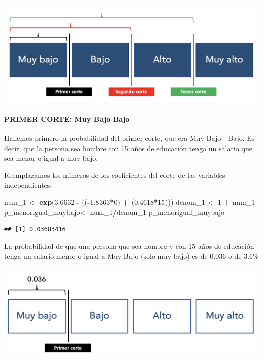 \documentclass[
]{article}
\newenvironment{Shaded}{\begin{snugshade}}{\end{snugshade}}
\newcommand{\DecValTok}[1]{\textcolor[rgb]{0.00,0.00,0.81}{#1}}
\newcommand{\FloatTok}[1]{\textcolor[rgb]{0.00,0.00,0.81}{#1}}
\newcommand{\FunctionTok}[1]{\textcolor[rgb]{0.13,0.29,0.53}{\textbf{#1}}}
\newcommand{\NormalTok}[1]{#1}
\newcommand{\OtherTok}[1]{\textcolor[rgb]{0.56,0.35,0.01}{#1}}
\newcommand{\SpecialCharTok}[1]{\textcolor[rgb]{0.81,0.36,0.00}{\textbf{#1}}}
\begin{document}
\begin{center}\includegraphics[width=0.8\linewidth]{Pd5_Cortes} \end{center}

\hypertarget{primer-corte-muy-bajo-bajo}{%
\paragraph{\texorpdfstring{\textbf{PRIMER CORTE: Muy Bajo \textbar{}
Bajo}}{PRIMER CORTE: Muy Bajo \textbar{} Bajo}}\label{primer-corte-muy-bajo-bajo}}

Hallemos primero la probabilidad del primer corte, que era Muy Bajo -
Bajo. Es decir, que la persona sea hombre con 15 años de educación tenga
un salario que sea menor o igual a muy bajo.

Reemplazamos los números de los coeficientes del corte de las variables
independientes.

\begin{Shaded}
\begin{Highlighting}[]
\NormalTok{num\_1 }\OtherTok{\textless{}{-}} \FunctionTok{exp}\NormalTok{(}\FloatTok{3.6632} \SpecialCharTok{{-}}\NormalTok{ ((}\SpecialCharTok{{-}}\FloatTok{1.8363}\SpecialCharTok{*}\DecValTok{0}\NormalTok{) }\SpecialCharTok{+}\NormalTok{ (}\FloatTok{0.4618}\SpecialCharTok{*}\DecValTok{15}\NormalTok{)))}
\NormalTok{denom\_1 }\OtherTok{\textless{}{-}} \DecValTok{1} \SpecialCharTok{+}\NormalTok{ num\_1}
\NormalTok{p\_menorigual\_muybajo}\OtherTok{\textless{}{-}}\NormalTok{ num\_1}\SpecialCharTok{/}\NormalTok{denom\_1}
\NormalTok{p\_menorigual\_muybajo}
\end{Highlighting}
\end{Shaded}

\begin{verbatim}
## [1] 0.03683416
\end{verbatim}

La probabilidad de que una persona que sea hombre y con 15 años de
educación tenga un salario menor o igual a Muy Bajo (solo muy bajo) es
de 0.036 o de 3.6\%

\begin{center}\includegraphics[width=0.8\linewidth]{pd5_corte1} \end{center}
\end{document}
